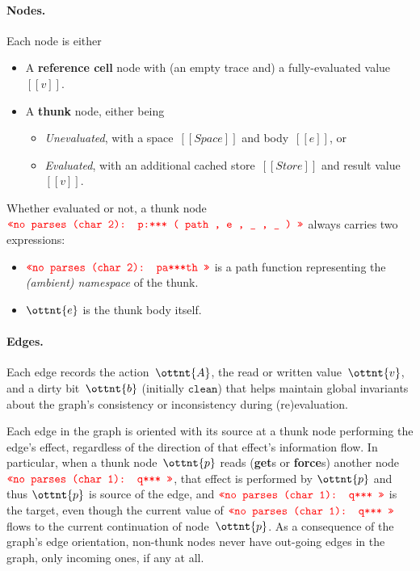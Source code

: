 \documentclass[11pt]{article}
\renewcommand{\ottkw}[1]{\mathtt{#1}}
\begin{document}
\paragraph{Nodes.}

Each node is either

\begin{itemize}
\item A \textbf{reference cell} node with (an empty trace and) a fully-evaluated value~$[[v]]$.
\item A \textbf{thunk} node, either being
  \begin{itemize}
  \item \emph{Unevaluated}, with a space~$[[Space]]$ and body~$[[e]]$, or
  \item \emph{Evaluated}, with an additional cached store~$[[Store]]$ and result value~$[[v]]$.
  \end{itemize} 
\end{itemize}

Whether evaluated or not, a thunk node~$\texttt{\textcolor{red}{<<no parses (char 2): p:*** ( path , e , \_ , \_ ) >>}}$ always
carries two expressions:
\begin{itemize}
\item $\texttt{\textcolor{red}{<<no parses (char 2): pa***th >>}}$ is a path function representing the \emph{(ambient) namespace} of the thunk.
\item $\ottnt{e}$ is the thunk body itself.
\end{itemize}

\paragraph{Edges.}
%
Each edge records the action~$\ottnt{A}$, the read or
written value~$\ottnt{v}$, and a dirty bit~$\ottnt{b}$ (initially $\ottkw{clean}$)
that helps maintain global invariants about the graph's consistency or
inconsistency during (re)evaluation.

Each edge in the graph is oriented with its source at a thunk node
performing the edge's effect, regardless of the direction of that
effect's information flow.
%
In particular, when a thunk node~$\ottnt{p}$ reads (\textbf{get}s or
\textbf{force}s) another node~$\texttt{\textcolor{red}{<<no parses (char 1): q*** >>}}$, that effect is performed by
$\ottnt{p}$ and thus $\ottnt{p}$ is source of the edge, and $\texttt{\textcolor{red}{<<no parses (char 1): q*** >>}}$ is the
target, even though the current value of $\texttt{\textcolor{red}{<<no parses (char 1): q*** >>}}$ flows to the current
continuation of node~$\ottnt{p}$.
%
As a consequence of the graph's edge orientation, non-thunk nodes
never have out-going edges in the graph, only incoming ones, if any at
all.
\end{document}
